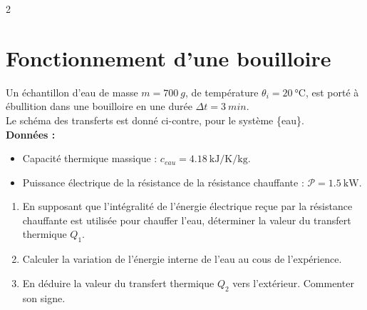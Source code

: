 \documentclass[a4paper,11pt,fleqn]{article}%
\begin{document}
\begin{multicols}{2}
\section{Fonctionnement d'une bouilloire}
Un échantillon d'eau de masse $m=\SI{700}{g}$, de température $\theta_i=\SI{20}{\celsius}$, est porté à ébullition dans une bouilloire en une durée $\Delta t =\SI{3}{min}$.\\
Le schéma des transferts est donné ci-contre, pour le système \{eau\}.\\
\textbf{Données :}\\
\begin{itemize}
	\item Capacité thermique massique : $c_{eau} =\SI{4,18}{\kilo\joule\per\kelvin\per\kilo\gram}$.
	\item Puissance électrique de la résistance de la résistance chauffante : $\mathcal{P} =\SI{1,5}{\kilo\watt}$.
\end{itemize}
\begin{enumerate}
	\item En supposant que l'intégralité de l'énergie électrique reçue par la résistance chauffante est utilisée pour chauffer l'eau, déterminer la valeur du transfert thermique $Q_1$.
	\item Calculer la variation de l'énergie interne de l'eau au cous de l'expérience.
	\item En déduire la valeur du transfert thermique $Q_2$ vers l'extérieur. Commenter son signe.
\end{enumerate}


\end{multicols}
\end{document}
